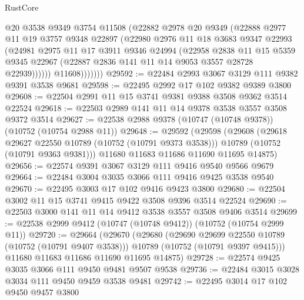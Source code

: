 \begin{lexlean}{RustCore}
\begin{coremodule}
                  @20
                  @3538
                  @9349
                  @3754
                  @11508
                  (@22882
                    @2978
                    @20
                    @9349
                    (@22888
                      @2977
                      @11
                      @19
                      @3757
                      @9348
                      @22897
                      (@22980
                        @2976
                        @11
                        @18
                        @3683
                        @9347
                        @22993
                        (@24981
                          @2975
                          @11
                          @17
                          @3911
                          @9346
                          @24994
                          (@22958
                            @2838
                            @11
                            @15
                            @5359
                            @9345
                            @22967
                            (@22887 @2836 @141 @11 @14 @9053 @3557 @28728 @22939))))))
                  @11608)))))))
@29592 := @22484 @2993 @3067 @3129 @111 @9382 @9391 @3538 @9681
@29598 := @22495 @2992 @17 @102 @9382 @9389 @3800
@29608 := @22504 @2991 @11 @15 @3741 @9381 @9388 @3508 @9362 @3514 @22524
@29618 := @22503 @2989 @141 @11 @14 @9378 @3538 @3557 @3508 @9372 @3514
@29627 := @22538 @2988 @9378 (@10747 (@10748 @9378)) (@10752 (@10754 @2988 @11))
@29648 := @29592
    (@29598
      (@29608
        (@29618 @29627 @22550 @10789 (@10752 (@10791 @9373 @3538)))
        @10789
        (@10752 (@10791 @9363 @9381)))
      @11680
      @11683
      @11686
      @11690
      @11695
      @14875)
@29656 := @22574 @9391 @3067 @3129 @111 @9416 @9540 @9566 @9679
@29664 := @22484 @3004 @3035 @3066 @111 @9416 @9425 @3538 @9540
@29670 := @22495 @3003 @17 @102 @9416 @9423 @3800
@29680 := @22504 @3002 @11 @15 @3741 @9415 @9422 @3508 @9396 @3514 @22524
@29690 := @22503 @3000 @141 @11 @14 @9412 @3538 @3557 @3508 @9406 @3514
@29699 := @22538 @2999 @9412 (@10747 (@10748 @9412)) (@10752 (@10754 @2999 @11))
@29720 := @29664
    (@29670
      (@29680
        (@29690 @29699 @22550 @10789 (@10752 (@10791 @9407 @3538)))
        @10789
        (@10752 (@10791 @9397 @9415)))
      @11680
      @11683
      @11686
      @11690
      @11695
      @14875)
@29728 := @22574 @9425 @3035 @3066 @111 @9450 @9481 @9507 @9538
@29736 := @22484 @3015 @3028 @3034 @111 @9450 @9459 @3538 @9481
@29742 := @22495 @3014 @17 @102 @9450 @9457 @3800

\end{coremodule}
\end{lexlean}
